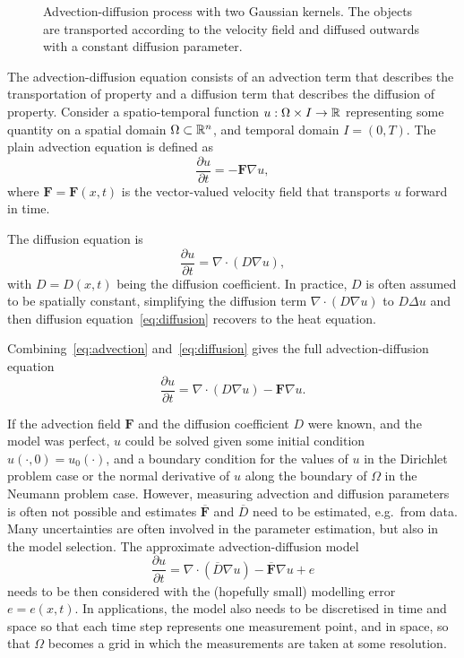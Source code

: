 \begin{figure}[H]
    \centering
    \caption{\label{fig:advection_diffusion}Advection-diffusion process with two Gaussian kernels.
    The objects are transported according to the velocity field and diffused outwards with a constant diffusion parameter.}
\end{figure}

The advection-diffusion equation consists of an advection term that describes the transportation of property and a diffusion term that describes the diffusion of property.
Consider a spatio-temporal function $u: \Omega \times I \rightarrow \mathbb{R}$ representing some quantity on a spatial domain $\Omega \subset \mathbb{R}^n$, and temporal domain $I = (0, T)$.
The plain advection equation is defined as
\begin{equation}\label{eq:advection}
    \frac{\partial u}{\partial t} =  - \mathbf{F} \nabla u,
\end{equation}
where $\mathbf{F} = \mathbf{F}(x,t)$ is the vector-valued velocity field that transports $u$ forward in time.

The diffusion equation is
\begin{equation}\label{eq:diffusion}
    \frac{\partial u}{\partial t} = \nabla \cdot (D \nabla u),
\end{equation}
with $D = D(x,t)$ being the diffusion coefficient.
In practice, $D$ is often assumed to be spatially constant, simplifying the diffusion term $\nabla \cdot (D \nabla u)$ to $D \Delta u$ and then diffusion equation~\eqref{eq:diffusion} recovers to the heat equation.

Combining~\eqref{eq:advection} and~\eqref{eq:diffusion} gives the full advection-diffusion equation
\begin{equation}\label{eq:advectiondiffusion}
    \frac{\partial u}{\partial t} = \nabla \cdot (D \nabla u) - \mathbf{F} \nabla u.
\end{equation}

If the advection field $\mathbf{F}$ and the diffusion coefficient $D$ were known, and the model was perfect, $u$ could be solved given some initial condition $u(\cdot, 0) = u_0(\cdot)$, and a boundary condition for the values of $u$ in the Dirichlet problem case or the normal derivative of $u$ along the boundary of $\Omega$ in the Neumann problem case.
However, measuring advection and diffusion parameters is often not possible and estimates $\overline{\mathbf{F}}$ and $\overline{D}$ need to be estimated, e.g.\ from data.
Many uncertainties are often involved in the parameter estimation, but also in the model selection.
The approximate advection-diffusion model
\begin{equation}\label{eq:advectiondiffusion_approx}
    \frac{\partial u}{\partial t} = \nabla \cdot (\overline{D} \nabla u) - \overline{\mathbf{F}} \nabla u + e
\end{equation}
needs to be then considered with the (hopefully small) modelling error $e = e(x,t)$.
In applications, the model also needs to be discretised in time and space so that each time step represents one measurement point, and in space, so that $\Omega$ becomes a grid in which the measurements are taken at some resolution.

